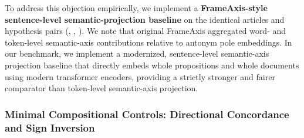 To address this objection empirically, we implement a \textbf{FrameAxis-style sentence-level semantic-projection baseline} on the identical articles and hypothesis pairs (, , ). We note that original FrameAxis \citep{kwak2021frameaxis} aggregated word- and token-level semantic-axis contributions relative to antonym pole embeddings. In our benchmark, we implement a modernized, sentence-level semantic-axis projection baseline that directly embeds whole propositions and whole documents using modern transformer encoders, providing a strictly stronger and fairer comparator than token-level semantic-axis projection.

\subsubsection{Minimal Compositional Controls: Directional Concordance and Sign Inversion}

